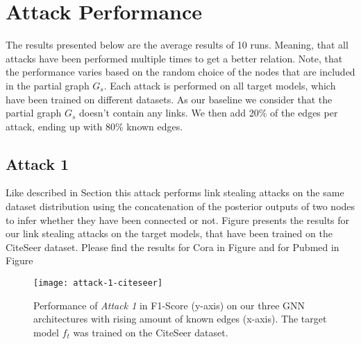     \section{Attack Performance}
        The results presented below are the average results of 10 runs.
        Meaning, that all attacks have been performed multiple times to get a better relation.
        Note, that the performance varies based on the random choice of the nodes that are included in the partial graph $G_s$.
        Each attack is performed on all target models, which have been trained on different datasets.
        As our baseline we consider that the partial graph $G_s$ doesn't contain any links.
        We then add 20\% of the edges per attack, ending up with 80\% known edges.

        \subsection*{Attack 1}
            Like described in Section  this attack performs link stealing attacks on the same dataset distribution using the concatenation of the posterior outputs of two nodes to infer whether they have been connected or not. 
            Figure  presents the results for our link stealing attacks on the target models, that have been trained on the CiteSeer dataset.
            Please find the results for Cora in Figure  and for Pubmed in Figure 

            \begin{figure}[h]
                \begin{center}
                    \texttt{[image: attack-1-citeseer]}
                    \caption[Attack 1 - $D_{f_t} = CiteSeer$]{Performance of \emph{Attack 1} in F1-Score (y-axis) on our three GNN architectures with rising amount of known edges (x-axis). The target model $f_t$ was trained on the CiteSeer dataset.}
                    \label{figure:eval-att1-citeseer}
                \end{center}
            \end{figure}

